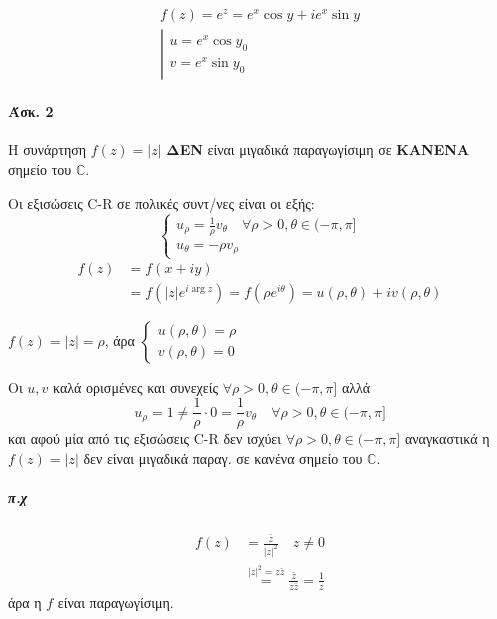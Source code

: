 \documentclass[12pt,a4paper,titlepage,fleqn]{article}
\begin{document}
	 
	 \paragraph{}
	 \begin{gather*}
	 f(z)=e^z=e^x\cos y+ie^x\sin y \\
	 \left|
	 \begin{array}{l}
	 u = e^x\cos y_0 \\ v=e^x\sin y_0
	 \end{array}
	 \right.
	 \end{gather*}
	 
	 
	 \paragraph{Άσκ. 2}
	 Η συνάρτηση \( f(z)=|z| \) \textbf{ΔΕΝ} είναι μιγαδικά παραγωγίσιμη σε
	 \textbf{ΚΑΝΕΝΑ} σημείο του \( \mathbb C  \).
	 
	 \begin{infobox}{}
	 	Οι εξισώσεις C-R σε πολικές συντ/νες είναι οι εξής:
	 	\[
	 	\begin{cases}
	 	u_\rho = \frac{1}{\rho}v_\theta \quad \forall \rho>0,
	 	         \theta\in(-\pi,\pi]\\
	 	u_\theta=-\rho v_\rho
	 	\end{cases}
	 	\]
	 	\tcblower
	 	\begin{align*}
	 	f(z) &= f(x+iy) \\
	 	     &= f\left( |z|e^{i\arg z} \right) = f\left(\rho e^{i\theta}\right)
	 	     = u(\rho,\theta)+iv(\rho,\theta)
	 	\end{align*}
	 \end{infobox}
	 
	 \( f(z)=|z|=\rho \), άρα \( \begin{cases}
	 u(\rho,\theta)=\rho \\ v(\rho,\theta)=0
	 \end{cases} \)
	 
	 Οι \( u,v \) καλά ορισμένες και συνεχείς \( \forall \rho>0,
	 \theta\in (-\pi,\pi]
	  \) αλλά \[
	  u_\rho = 1 \neq \frac{1}{\rho}\cdot 0 =\frac{1}{\rho}v_\theta
	  \quad \forall \rho>0,\theta\in(-\pi,\pi]
	  \]
	  και αφού μία από τις εξισώσεις C-R δεν ισχύει \( \forall \rho>0,
	  \theta\in(-\pi,\pi]
	   \) αναγκαστικά η \( f(z)=|z| \) δεν είναι μιγαδικά παραγ. σε κανένα
	   σημείο του \( \mathbb C  \).
	\subparagraph{π.χ}
	\begin{align*}
	f(z) &= \frac{\bar z}{|z|^2} \quad z\neq0
	\\ &\overset{|z|^2=z\bar z}{=} \frac{\bar z}{z\bar z}=\frac{1}{z}
	\end{align*}
	άρα η \( f \) είναι παραγωγίσιμη.
	
\end{document}
